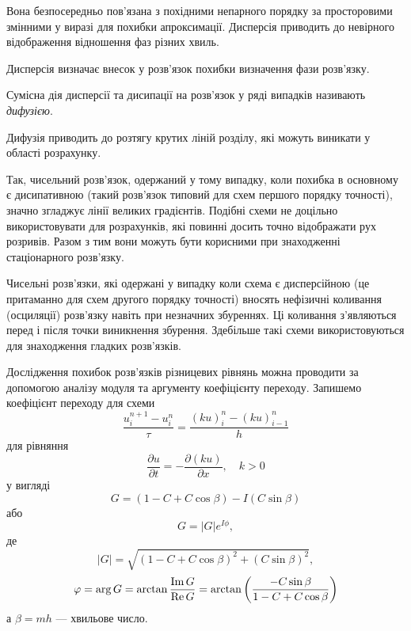 Вона безпосередньо пов'язана з похідними непарного порядку за просторовими змінними у виразі для похибки апроксимації. Дисперсія приводить до невірного відображення відношення фаз різних хвиль. \medskip

Дисперсія визначає внесок у розв'язок похибки визначення фази розв'язку.

\begin{definition}
    Сумісна дія дисперсії та дисипації на розв'язок у ряді випадків називають \emph{дифузією}.
\end{definition}

Дифузія приводить до розтягу крутих ліній розділу, які можуть виникати у області розрахунку. \medskip

Так, чисельний розв'язок, одержаний у тому випадку, коли похибка в основному є дисипативною (такий розв'язок типовий для схем першого порядку точності), значно згладжує лінії великих градієнтів. Подібні схеми не доцільно використовувати для розрахунків, які повинні досить точно відображати рух розривів. Разом з тим вони можуть бути корисними при знаходженні стаціонарного розв'язку.\medskip

Чисельні розв'язки, які одержані у випадку коли схема є дисперсійною (це притаманно для схем другого порядку точності) вносять нефізичні коливання (осциляції) розв'язку навіть при незначних збуреннях. Ці коливання з'являються перед і після точки виникнення збурення. Здебільше такі схеми використовуються для знаходження гладких розв'язків. \medskip

Дослідження похибок розв'язків різницевих рівнянь можна проводити за допомогою аналізу модуля та аргументу коефіцієнту переходу. Запишемо коефіцієнт переходу для схеми  
\begin{equation*}
    \frac{u_i^{n+1}-u_i^n}{\tau}=\frac{(ku)_i^n-(ku)_{i-1}^n}{h}
\end{equation*}
для рівняння
\begin{equation*}
    \frac{\partial u}{\partial t} = -\frac{\partial (k u)}{\partial x}, \quad k > 0
\end{equation*}
у вигляді
\begin{equation*}
    G = (1 - C + C \cos \beta) - I (C \sin \beta)
\end{equation*}
або
\begin{equation*}
    G = |G| e^{I\phi},
\end{equation*}
де 
\begin{equation*}
    |G| = \sqrt{(1-C+C\cos\beta)^2+(C\sin\beta)^2},
\end{equation*}
\begin{equation*}
    \varphi = \arg G = \arctan \frac{\operatorname{Im} G}{\operatorname{Re} G} = \arctan \left( \frac{-C\sin\beta}{1-C+C\cos\beta}\right)
\end{equation*}
а $\beta=mh$ --- хвильове число.

